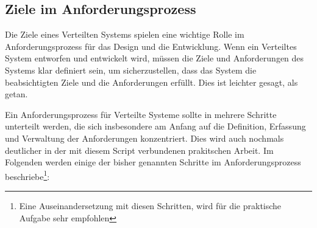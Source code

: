 \subsection{Ziele im Anforderungsprozess}
Die Ziele eines Verteilten Systems spielen eine wichtige Rolle im Anforderungsprozess für das Design und die Entwicklung. Wenn ein Verteiltes System entworfen und entwickelt wird, müssen die Ziele und Anforderungen des Systems klar definiert sein, um sicherzustellen, dass das System die beabsichtigten Ziele und die Anforderungen erfüllt. Dies ist leichter gesagt, als getan.

Ein Anforderungsprozess für Verteilte Systeme sollte in mehrere Schritte unterteilt werden, die sich insbesondere am Anfang auf die Definition, Erfassung und Verwaltung der Anforderungen konzentriert. Dies wird auch nochmals deutlicher in der mit diesem Script verbundenen prakitschen Arbeit. Im Folgenden werden einige der bisher genannten Schritte im Anforderungsprozess beschriebe\footnote{Eine Auseinandersetzung mit diesen Schritten, wird für die praktische Aufgabe sehr empfohlen}:
